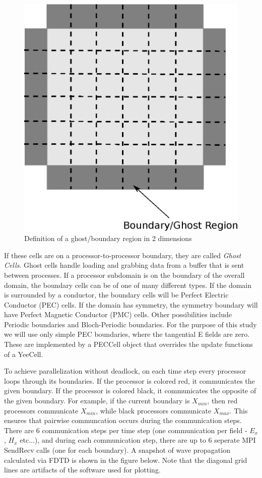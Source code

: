 \documentclass{article}
\begin{document}
\begin{figure}[h]
\centering
\includegraphics[scale=0.5]{figs/ghost_region.eps}
\caption{Definition of a ghost/boundary region in 2 dimensions}
\end{figure}


If these cells are on a processor-to-processor boundary, they are called \textit{Ghost Cells}. Ghost cells handle loading and grabbing data from a buffer that is sent between processes. If a processor subdomain is on the boundary of the overall domain, the boundary cells can be of one of many different types. If the domain is surrounded by a conductor, the boundary cells will be Perfect Electric Conductor (PEC) cells. If the domain has symmetry, the symmetry boundary will have Perfect Magnetic Conductor (PMC) cells. Other possibilities include Periodic boundaries and Bloch-Periodic boundaries. For the purpose of this study we will use only simple PEC boundaries, where the tangential E fields are zero. These are implemented by a PECCell object that overrides the update functions of a YeeCell.

To achieve parallelization without deadlock, on each time step every processor loops through its boundaries. If the processor is colored red, it communicates the given boundary. If the processor is colored black, it communicates the opposite of the given boundary. For example, if the current boundary is $X_{min}$, then red processors communicate $X_{min}$, while black processors communicate $X_{max}$. This ensures that pairwise communcation occurs during the communication steps. There are 6 communication steps per time step (one communication per field - $E_x$, $H_x$ etc...), and during each communication step, there are up to 6 seperate MPI SendRecv calls (one for each boundary). A snapshot of wave propagation calculated via FDTD is shown in the figure below. Note that the diagonal grid lines are artifacts of the software used for plotting.
\end{document}
